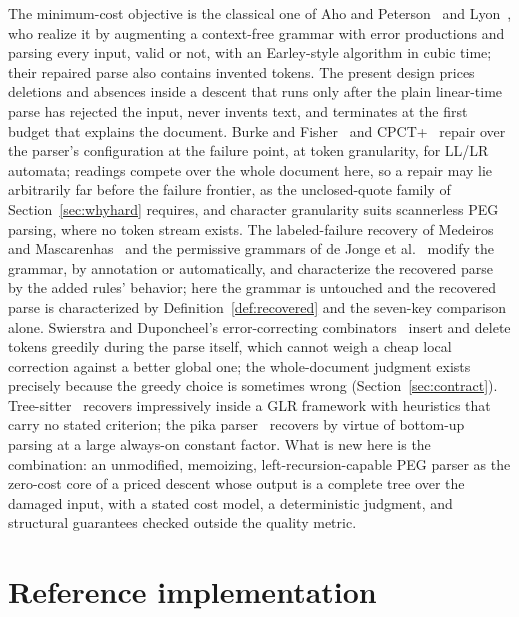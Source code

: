 \documentclass[manuscript]{acmart}
\begin{document}
The minimum-cost objective is the classical one of Aho and Peterson~\cite{aho1972} and Lyon~\cite{lyon1974}, who realize it by augmenting a context-free grammar with error productions and parsing every input, valid or not, with an Earley-style algorithm in cubic time; their repaired parse also contains invented tokens. The present design prices deletions and absences inside a descent that runs only after the plain linear-time parse has rejected the input, never invents text, and terminates at the first budget that explains the document. Burke and Fisher~\cite{burke1987} and CPCT+~\cite{diekmann2020} repair over the parser's configuration at the failure point, at token granularity, for LL/LR automata; readings compete over the whole document here, so a repair may lie arbitrarily far before the failure frontier, as the unclosed-quote family of Section~\ref{sec:whyhard} requires, and character granularity suits scannerless PEG parsing, where no token stream exists. The labeled-failure recovery of Medeiros and Mascarenhas~\cite{medeiros2018,medeiros2020} and the permissive grammars of de Jonge et al.~\cite{dejonge2012} modify the grammar, by annotation or automatically, and characterize the recovered parse by the added rules' behavior; here the grammar is untouched and the recovered parse is characterized by Definition~\ref{def:recovered} and the seven-key comparison alone. Swierstra and Duponcheel's error-correcting combinators~\cite{swierstra1996} insert and delete tokens greedily during the parse itself, which cannot weigh a cheap local correction against a better global one; the whole-document judgment exists precisely because the greedy choice is sometimes wrong (Section~\ref{sec:contract}). Tree-sitter~\cite{treesitter} recovers impressively inside a GLR framework with heuristics that carry no stated criterion; the pika parser~\cite{hutchison2020} recovers by virtue of bottom-up parsing at a large always-on constant factor. What is new here is the combination: an unmodified, memoizing, left-recursion-capable PEG parser as the zero-cost core of a priced descent whose output is a complete tree over the damaged input, with a stated cost model, a deterministic judgment, and structural guarantees checked outside the quality metric.

\section{Reference implementation}
\label{sec:software}
\end{document}
